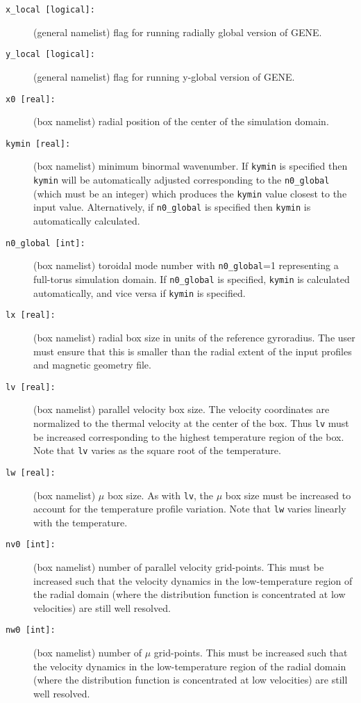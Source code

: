 \documentclass[11pt]{article}
\begin{document}
\begin{titlepage}

\begin{description}
\item[\texttt{x\_local [logical]:}] (general namelist) flag for running radially global version of GENE.
\item[\texttt{y\_local [logical]:}] (general namelist) flag for running y-global version of GENE.
\item[\texttt{x0 [real]:}] (box namelist) radial position of the center of the simulation domain.
\item[\texttt{kymin [real]:}] (box namelist) minimum binormal wavenumber.  If \texttt{kymin} is specified then \texttt{kymin} will be automatically adjusted corresponding to the \texttt{n0\_global} (which must be an integer) which produces the \texttt{kymin} value closest to the input value.  Alternatively, if \texttt{n0\_global} is specified then \texttt{kymin} is automatically calculated.
\item[\texttt{n0\_global [int]:}] (box namelist) toroidal mode number with \texttt{n0\_global}=1 representing a full-torus simulation domain.  If \texttt{n0\_global} is specified, \texttt{kymin} is calculated automatically, and vice versa if \texttt{kymin} is specified.  
\item[\texttt{lx [real]:}] (box namelist) radial box size in units of the reference gyroradius.  The user must ensure that this is smaller than the radial extent of the input profiles and magnetic geometry file.
\item[\texttt{lv [real]:}] (box namelist) parallel velocity box size.  The velocity coordinates are normalized to the thermal velocity at the center of the box.  Thus \texttt{lv} must be increased corresponding to the highest temperature region of the box.  Note that \texttt{lv} varies as the square root of the temperature.  
\item[\texttt{lw [real]:}] (box namelist) $\mu$ box size.  As with \texttt{lv}, the $\mu$ box size must be increased to account for the temperature profile variation.  Note that \texttt{lw} varies linearly with the temperature.
\item[\texttt{nv0 [int]:}] (box namelist) number of parallel velocity grid-points.  This must be increased such that the velocity dynamics in the low-temperature region of the radial domain (where the distribution function is concentrated at low velocities) are still well resolved.
\item[\texttt{nw0 [int]:}] (box namelist) number of $\mu$ grid-points.  This must be increased such that the velocity dynamics in the low-temperature region of the radial domain (where the distribution function is concentrated at low velocities) are still well resolved.

\end{description}
\end{titlepage}
\end{document}
